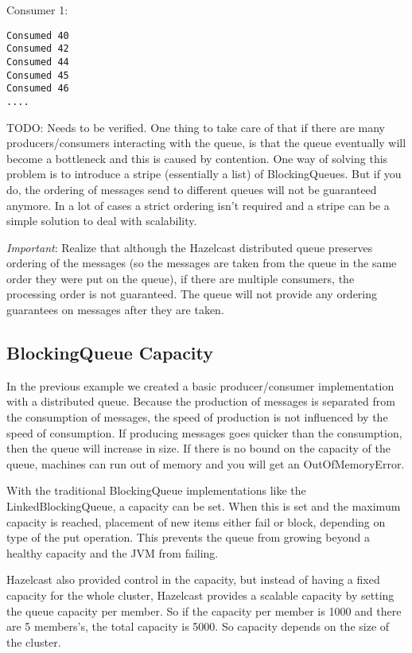Consumer 1:
\begin{verbatim}
Consumed 40  
Consumed 42 
Consumed 44 
Consumed 45
Consumed 46
....
\end{verbatim}

TODO: Needs to be verified.
One thing to take care of that if there are many producers/consumers interacting with the queue, is that the queue eventually will become a bottleneck and this is caused by contention. One way of solving this problem is to introduce a stripe (essentially a list) of BlockingQueues. But if you do, the ordering of messages send to different queues will not be guaranteed anymore. In a lot of cases a strict ordering isn't required and a stripe can be a simple solution to deal with scalability.

\emph{Important}: Realize that although the Hazelcast distributed queue preserves ordering of the messages (so the messages are taken from the queue in the same order they were put on the queue), if there are multiple consumers, the processing order is not guaranteed. The queue will not provide any ordering guarantees on messages after they are taken.

\subsection{BlockingQueue Capacity}

In the previous example we created a basic producer/consumer implementation with a distributed queue. Because the production of messages is separated from the consumption of messages, the speed of production is not influenced by the speed of consumption. If producing messages goes quicker than the consumption, then the queue will increase in size. If there is no bound on the capacity of the queue, machines can run out of memory and you will get an OutOfMemoryError. 

With the traditional BlockingQueue implementations like the LinkedBlockingQueue, a capacity can be set. When this is set and the maximum capacity is reached, placement of new items either fail or block, depending on type of the put operation. This prevents the queue from growing beyond a healthy capacity and the JVM from failing.

Hazelcast also provided control in the capacity, but instead of having a fixed capacity for the whole cluster, Hazelcast provides a scalable capacity by setting the queue capacity per member. So if the capacity per member is 1000 and there are 5 members's, the total capacity is 5000. So capacity depends on the size of the cluster.

